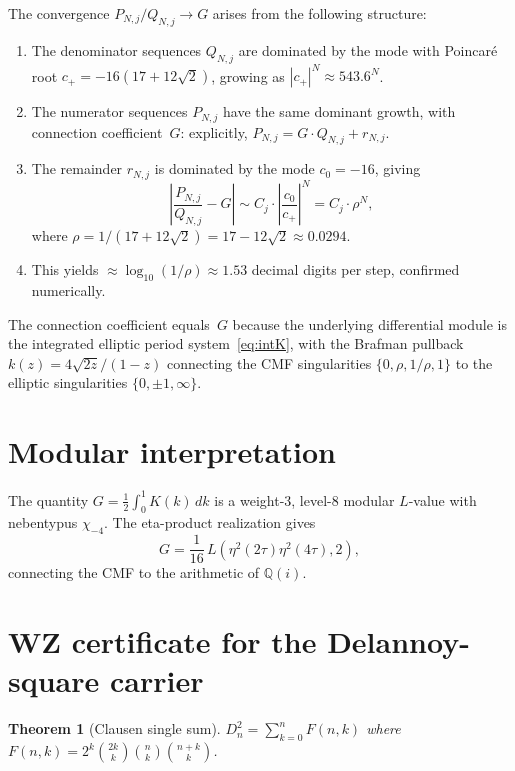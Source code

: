 \documentclass[11pt]{article}
\newtheorem{theorem}{Theorem}
\begin{document}
The convergence $P_{N,j}/Q_{N,j} \to G$ arises from the
following structure:

\begin{enumerate}
\item The denominator sequences $Q_{N,j}$ are dominated by
the mode with Poincar\'e root $c_+ = -16(17+12\sqrt{2})$,
growing as $|c_+|^N \approx 543.6^N$.

\item The numerator sequences $P_{N,j}$ have the same dominant
growth, with connection coefficient~$G$: explicitly,
$P_{N,j} = G \cdot Q_{N,j} + r_{N,j}$.

\item The remainder $r_{N,j}$ is dominated by the mode
$c_0 = -16$, giving
\[
\left|\frac{P_{N,j}}{Q_{N,j}} - G\right|
\sim C_j \cdot \left|\frac{c_0}{c_+}\right|^N
= C_j \cdot \rho^N,
\]
where $\rho = 1/(17+12\sqrt{2}) = 17-12\sqrt{2} \approx 0.0294$.

\item This yields $\approx \log_{10}(1/\rho) \approx 1.53$
decimal digits per step, confirmed numerically.
\end{enumerate}

The connection coefficient equals~$G$ because the underlying
differential module is the integrated elliptic period
system~\eqref{eq:intK}, with the Brafman pullback
$k(z) = 4\sqrt{2z}/(1-z)$ connecting the CMF singularities
$\{0, \rho, 1/\rho, 1\}$ to the elliptic singularities
$\{0, \pm 1, \infty\}$.

\section{Modular interpretation}

The quantity $G = \frac{1}{2}\int_0^1 K(k)\,dk$ is a
weight-3, level-8 modular $L$-value with nebentypus $\chi_{-4}$.
The eta-product realization gives
\[
G = \frac{1}{16}\,L(\eta^2(2\tau)\eta^2(4\tau), 2),
\]
connecting the CMF to the arithmetic of $\mathbb{Q}(i)$.

\section{WZ certificate for the Delannoy-square carrier}

\begin{theorem}[Clausen single sum]
$D_n^2 = \sum_{k=0}^n F(n,k)$ where
$F(n,k) = 2^k \binom{2k}{k}\binom{n}{k}\binom{n+k}{k}$.
\end{theorem}
\end{document}
